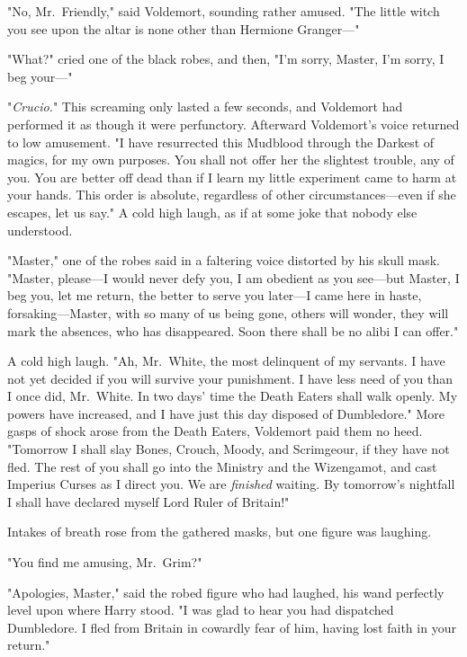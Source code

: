 "No, Mr.~Friendly," said Voldemort, sounding rather amused. "The little witch
you see upon the altar is none other than Hermione Granger\mbox{---}"

"What?" cried one of the black robes, and then, "I'm sorry, Master, I'm sorry,
I beg your\mbox{---}"

"\emph{Crucio.}" This screaming only lasted a few seconds, and Voldemort had
performed it as though it were perfunctory. Afterward Voldemort's voice
returned to low amusement. "I have resurrected this Mudblood through the
Darkest of magics, for my own purposes. You shall not offer her the slightest
trouble, any of you. You are better off dead than if I learn my little
experiment came to harm at your hands. This order is absolute, regardless of
other circumstances---even if she escapes, let us say." A cold high laugh, as
if at some joke that nobody else understood.

"Master," one of the robes said in a faltering voice distorted by his skull
mask. "Master, please---I would never defy you, I am obedient as you see---but
Master, I beg you, let me return, the better to serve you later---I came here
in haste, forsaking---Master, with so many of us being gone, others will
wonder, they will mark the absences, who has disappeared. Soon there shall be
no alibi I can offer."

A cold high laugh. "Ah, Mr.~White, the most delinquent of my servants. I have
not yet decided if you will survive your punishment. I have less need of you
than I once did, Mr.~White. In two days' time the Death Eaters shall walk
openly. My powers have increased, and I have just this day disposed of
Dumbledore." More gasps of shock arose from the Death Eaters, Voldemort paid
them no heed. "Tomorrow I shall slay Bones, Crouch, Moody, and Scrimgeour, if
they have not fled. The rest of you shall go into the Ministry and the
Wizengamot, and cast Imperius Curses as I direct you. We are \emph{finished}
waiting. By tomorrow's nightfall I shall have declared myself Lord Ruler of
Britain!"

Intakes of breath rose from the gathered masks, but one figure was laughing.

"You find me amusing, Mr.~Grim?"

"Apologies, Master," said the robed figure who had laughed, his wand perfectly
level upon where Harry stood. "I was glad to hear you had dispatched
Dumbledore. I fled from Britain in cowardly fear of him, having lost faith in
your return."

